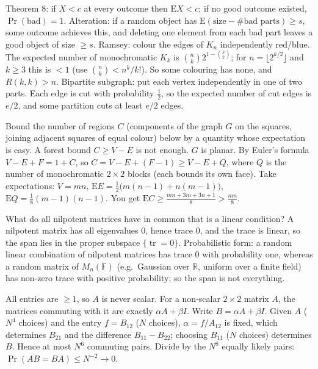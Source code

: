 \documentclass[11pt,a4paper]{article}
\begin{document}

 Theorem 8: if $X<c$ at every outcome then $\mathrm EX<c$; if no good outcome existed, $\Pr(\text{bad})=1$. Alteration: if a random object has $\mathrm E(\text{size}-\#\text{bad parts})\ge s$, some outcome achieves this, and deleting one element from each bad part leaves a good object of size $\ge s$.
 Ramsey: colour the edges of $K_n$ independently red/blue. The expected number of monochromatic $K_k$ is $\binom nk2^{1-\binom k2}$; for $n=\lfloor2^{k/2}\rfloor$ and $k\ge3$ this is $<1$ (use $\binom nk<n^k/k!$). So some colouring has none, and $R(k,k)>n$.
 Bipartite subgraph: put each vertex independently in one of two parts. Each edge is cut with probability $\frac12$, so the expected number of cut edges is $e/2$, and some partition cuts at least $e/2$ edges.

 Bound the number of regions $C$ (components of the graph $G$ on the squares, joining adjacent squares of equal colour) below by a quantity whose expectation is easy. A forest bound $C\ge V-E$ is not enough.
 $G$ is planar. By Euler's formula $V-E+F=1+C$, so $C=V-E+(F-1)\ge V-E+Q$, where $Q$ is the number of monochromatic $2\times2$ blocks (each bounds its own face).
 Take expectations: $V=mn$, $\mathrm EE=\frac12\big(m(n-1)+n(m-1)\big)$, $\mathrm EQ=\frac18(m-1)(n-1)$. You get $\mathrm EC\ge\frac{mn+3m+3n+1}8>\frac{mn}8$.

 What do all nilpotent matrices have in common that is a linear condition?
 A nilpotent matrix has all eigenvalues $0$, hence trace $0$, and the trace is linear, so the span lies in the proper subspace $\{\operatorname{tr}=0\}$. Probabilistic form: a random linear combination of nilpotent matrices has trace $0$ with probability one, whereas a random matrix of $M_n(\mathbb F)$ (e.g.\ Gaussian over $\mathbb R$, uniform over a finite field) has non-zero trace with positive probability; so the span is not everything.

 All entries are $\ge1$, so $A$ is never scalar. For a non-scalar $2\times2$ matrix $A$, the matrices commuting with it are exactly $\alpha A+\beta I$.
 Write $B=\alpha A+\beta I$. Given $A$ ($N^4$ choices) and the entry $f=B_{12}$ ($N$ choices), $\alpha=f/A_{12}$ is fixed, which determines $B_{21}$ and the difference $B_{11}-B_{22}$; choosing $B_{11}$ ($N$ choices) determines $B$. Hence at most $N^6$ commuting pairs.
 Divide by the $N^8$ equally likely pairs: $\Pr(AB=BA)\le N^{-2}\to0$.
\end{document}
